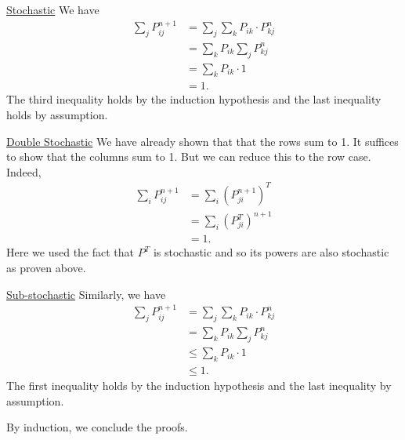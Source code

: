 \documentclass[10pt]{article}
\begin{document}
\underline{Stochastic}
We have
\begin{align*}
  \sum_j P_{ij}^{n+1}
  &= \sum_j \sum_k P_{ik}\cdot P_{kj}^n \\
  &= \sum_k P_{ik} \sum_j P_{kj}^n \\
  &= \sum_k P_{ik}\cdot 1 \\
  &= 1.
\end{align*}
The third inequality holds by the induction hypothesis
and the last inequality holds by assumption.

\underline{Double Stochastic}
We have already shown that that the rows sum to 1.
It suffices to show that the columns sum to 1.
But we can reduce this to the row case.
Indeed,
\begin{align*}
  \sum_i P_{ij}^{n+1}
  &= \sum_i (P_{ji}^{n+1})^T \\
  &= \sum_i (P_{ji}^T)^{n+1} \\
  &= 1.
\end{align*}
Here we used the fact that $P^T$ is stochastic
and so its powers are also stochastic
as proven above.

\underline{Sub-stochastic}
Similarly,
we have
\begin{align*}
  \sum_j P_{ij}^{n+1}
  &= \sum_j \sum_k P_{ik}\cdot P_{kj}^n \\
  &= \sum_k P_{ik} \sum_j P_{kj}^n \\
  &\leq \sum_k P_{ik}\cdot 1 \\
  &\leq 1.
\end{align*}
The first inequality holds by the induction hypothesis
and the last inequality by assumption.

By induction,
we conclude the proofs.

\clearpage
\section{}
\section{}
\end{document}
